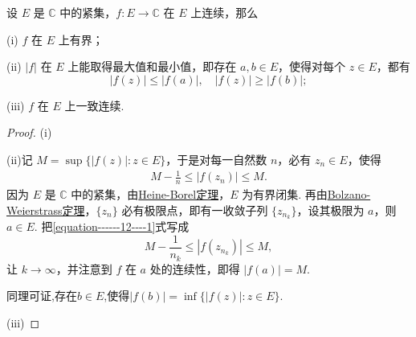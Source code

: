 \documentclass[../../main.tex]{subfiles}
\begin{document}
\begin{theorem}\label{theorem:连续的复变函数在紧集上的性质}
设 $E$ 是 $\mathbb{C}$ 中的紧集，$f: E \to \mathbb{C}$ 在 $E$ 上连续，那么

(i) $f$ 在 $E$ 上有界；

(ii) $|f|$ 在 $E$ 上能取得最大值和最小值，即存在 $a, b \in E$，使得对每个 $z \in E$，都有
\[
|f(z)| \leqslant |f(a)|, \quad |f(z)| \geqslant |f(b)|;
\]

(iii) $f$ 在 $E$ 上一致连续.
\end{theorem}
\begin{proof}
(i)

(ii)记 $M = \sup\{|f(z)|: z \in E\}$，于是对每一自然数 $n$，必有 $z_n \in E$，使得
\begin{align}\label{equation------12----1}
M - \frac{1}{n} \leqslant |f(z_n)| \leqslant M.
\end{align}
因为 $E$ 是 $\mathbb{C}$ 中的紧集，由\hyperref[theorem:Heine-Borel定理]{Heine-Borel定理}，$E$ 为有界闭集. 再由\hyperref[theorem:Bolzano-Weierstrass定理]{Bolzano-Weierstrass定理}，$\{z_n\}$ 必有极限点，即有一收敛子列 $\{z_{n_k}\}$，设其极限为 $a$，则 $a \in E$. 把\eqref{equation------12----1}式写成
\[
M - \frac{1}{n_k} \leqslant |f(z_{n_k})| \leqslant M,
\]
让 $k \to \infty$，并注意到 $f$ 在 $a$ 处的连续性，即得 $|f(a)| = M$. 

同理可证,存在$b\in E$,使得$|f(b)|=\inf\{|f(z)|:z\in E\}.$

(iii)

\end{proof}
\end{document}
